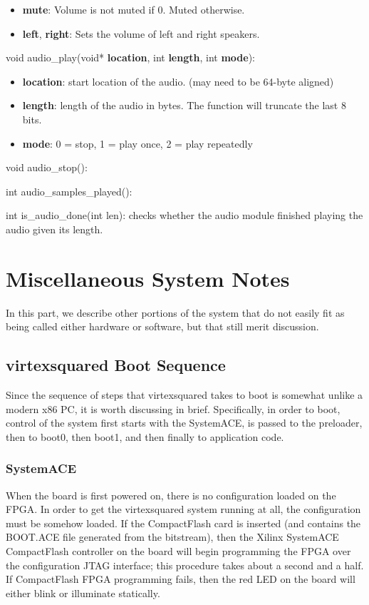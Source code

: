 \documentclass[10pt]{report}
\begin{document}
\begin{itemize}
\item{\textbf{mute}: Volume is not muted if 0. Muted otherwise.}
\item{\textbf{left}, \textbf{right}: Sets the volume of left and right speakers.}
\end{itemize}

void audio\_play(void* \textbf{location}, int \textbf{length}, int \textbf{mode}):

\begin{itemize}
\item{\textbf{location}: start location of the audio. (may need to be 64-byte aligned)}
\item{\textbf{length}: length of the audio in bytes. The function will truncate the last 8 bits.}
\item{\textbf{mode}: 0 = stop, 1 = play once, 2 = play repeatedly}
\end{itemize}

void audio\_stop():

int audio\_samples\_played():

int is\_audio\_done(int len): checks whether the audio module finished playing the audio given its length.

\chapter{Miscellaneous System Notes}

In this part, we describe other portions of the system that do not easily
fit as being called either hardware or software, but that still merit
discussion.

\section{virtexsquared Boot Sequence}
\label{sec:boot}

Since the sequence of steps that virtexsquared takes to boot is somewhat
unlike a modern x86 PC, it is worth discussing in brief. Specifically, in
order to boot, control of the system first starts with the SystemACE, is
passed to the preloader, then to boot0, then boot1, and then finally to
application code.

\subsection{SystemACE}

When the board is first powered on, there is no configuration loaded on the
FPGA. In order to get the virtexsquared system running at all, the
configuration must be somehow loaded. If the CompactFlash card is inserted
(and contains the BOOT.ACE file generated from the bitstream), then the
Xilinx SystemACE CompactFlash controller on the board will begin programming
the FPGA over the configuration JTAG interface; this procedure takes about a
second and a half. If CompactFlash FPGA programming fails, then the red LED
on the board will either blink or illuminate statically.
\end{document}
